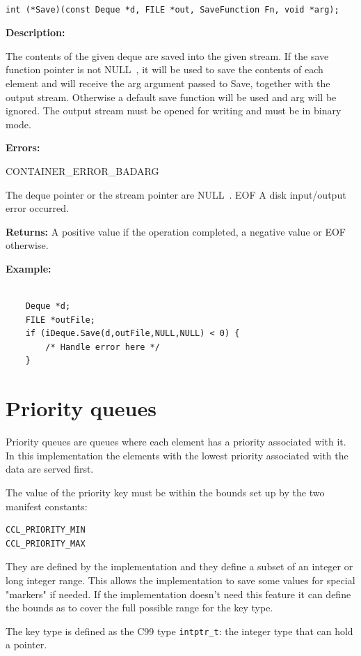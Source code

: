 \documentclass[12pt,a4paper,openany]{memoir} %
\newif\iftth
\newcommand{\api}[1] {%
 \iftth\else\Needspace{3\baselineskip}\fi%
\par\vspace{0.4cm}
\addcontentsline{toc}{subsubsection}{#1}
\index{#1!\container}
\addtocounter{apis}{1}
\noindent {\large \textbf{#1}} \hrulefill%
\iftth\else
\nopagebreak
\fi
\begin{verbatim}
}
\newcommand{\container}{}
\newcommand{\apidescription}{%
\par \noindent \textbf{Description:} %\par\noindent
}
\newcommand{\apierrors}{%
\par \noindent \textbf{Errors:}\par\noindent
}
\newcommand{\doerror}[1]{%
\par\noindent
\iftth
{CONTAINER\_ERROR\_#1}
\else
{\footnotesize CONTAINER\_ERROR\_#1}
\fi
}
\newcommand{\Null}{{\iftth \ NULL \else \footnotesize NULL\  \fi}}
\newcommand{\returns}{\par\noindent\textbf{Returns:}}
\newcommand{\example}{
\par\noindent
\textbf{Example:}
\begin{verbatim}
}
\newcounter{apis}
\begin{document}
{{%---------------------------------------------------------------------------------------------------------------------------------------
\api{Save}
int (*Save)(const Deque *d, FILE *out, SaveFunction Fn, void *arg);
\end{verbatim}
\apidescription
The contents of the given deque are saved into the given stream. If the save function pointer is not \Null, it will be used to save the contents of each element and will receive the arg argument passed to Save, together with the output stream. Otherwise a default save function will be used and arg will be ignored.
The output stream must be opened for writing and must be in binary mode.
\apierrors
\doerror{BADARG} The deque pointer or the stream pointer are \Null.
EOF A disk input/output error occurred.
\returns
A positive value if the operation completed, a negative value or EOF otherwise.
\example
    Deque *d;
    FILE *outFile;
    if (iDeque.Save(d,outFile,NULL,NULL) < 0) { 
        /* Handle error here */
    }
\end{verbatim}
\newpage
\section{Priority queues}
\renewcommand{\container}{PriorityQueues}
Priority queues are queues where each element has a priority associated with it. In this implementation the elements with the lowest priority
associated with the data are served first.

The value of the priority key must be within the bounds set up by the two manifest constants:
\begin{verbatim}
CCL_PRIORITY_MIN
CCL_PRIORITY_MAX
\end{verbatim}

They are defined by the implementation and they define a subset of an integer or long integer range. This allows the implementation to save some
values for special "markers" if needed. If the implementation doesn't need this feature it can define the bounds as to cover the full
possible range for the key type.

The key type is defined as the C99 type \verb,intptr_t,: the integer type that can hold a pointer.

}}
\end{document}
